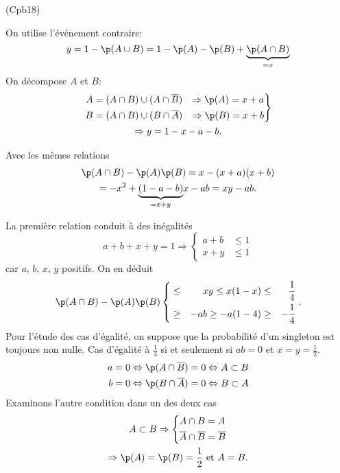 \begin{tiny}(Cpb18)\end{tiny} On utilise l'événement contraire:
\[
  y = 1 - \p(A \cup B)
  = 1 -\p(A) - \p(B) + \underset{=x}{\underbrace{\p(A\cap B)}}
\]
On décompose $A$ et $B$:
\begin{multline*}
\left.
  \begin{aligned}
    A &= (A\cap B) \cup (A \cap \overline{B}) &\Rightarrow \p(A) = x + a\\
    B &= (A\cap B) \cup (B \cap \overline{A}) &\Rightarrow \p(B) = x + b
  \end{aligned}
\right\rbrace \\ \Rightarrow
y = 1 - x -a -b.
\end{multline*}

Avec les mêmes relations
\begin{multline*}
  \p(A \cap B) -\p(A) \p(B)
  = x -(x+a)(x+b) \\
  = -x^2 + \underset{=x+y}{\underbrace{(1-a-b)}} x -ab
  = xy - ab.
\end{multline*}

La première relation conduit à des inégalités
\[
  a + b + x + y = 1
  \Rightarrow
  \left\lbrace
  \begin{aligned}
    a + b &\leq 1 \\ x + y &\leq 1
  \end{aligned}
  \right.
\]
car $a$, $b$, $x$, $y$ positifs. On en déduit
\[
\p(A \cap B) -\p(A) \p(B)
\left\lbrace
\begin{aligned}
   &\leq& xy  \leq x(1-x)  &\leq& \frac{1}{4} \\
   &\geq& -ab \geq -a(1-4) &\geq& -\frac{1}{4}
\end{aligned}
\right. .
\]
Pour l'étude des cas d'égalité, on suppose que la probabilité d'un singleton est toujours non nulle.\newline
Cas d'égalité à $\frac{1}{4}$ si et seulement si $ab =0$ et $x = y = \frac{1}{2}$.
\[
\begin{aligned}
  a= 0 &\Leftrightarrow \p(A \cap \overline{B}) = 0 \Leftrightarrow A \subset B\\
  b= 0 &\Leftrightarrow \p(B \cap \overline{A}) = 0 \Leftrightarrow B \subset A
\end{aligned}
\]
Examinons l'autre condition dans un des deux cas
\begin{multline*}
  A \subset B \Rightarrow
  \left\lbrace
  \begin{aligned}
    A\cap B &= A \\ \overline{A} \cap \overline{B} &= \overline{B}
  \end{aligned}
\right. \\
\Rightarrow \p(A) = \p(B) = \frac{1}{2} \text{ et } A = B.
\end{multline*}

